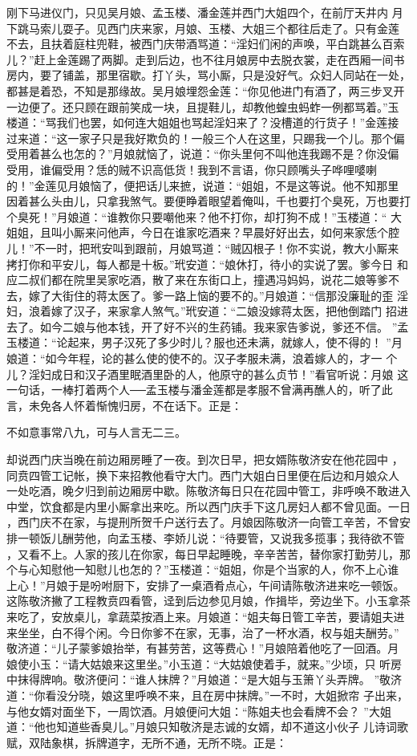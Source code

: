 刚下马进仪门，只见吴月娘、孟玉楼、潘金莲并西门大姐四个，在前厅天井内
月下跳马索儿耍子。见西门庆来家，月娘、玉楼、大姐三个都往后走了。只有金莲
不去，且扶着庭柱兜鞋，被西门庆带酒骂道：“淫妇们闲的声唤，平白跳甚么百索
儿？”赶上金莲踢了两脚。走到后边，也不往月娘房中去脱衣裳，走在西厢一间书
房内，要了铺盖，那里宿歇。打丫头，骂小厮，只是没好气。众妇人同站在一处，
都甚是着恐，不知是那缘故。吴月娘埋怨金莲：“你见他进门有酒了，两三步叉开
一边便了。还只顾在跟前笑成一块，且提鞋儿，却教他蝗虫蚂蚱一例都骂着。”玉
楼道：“骂我们也罢，如何连大姐姐也骂起淫妇来了？没槽道的行货子！”金莲接
过来道：“这一家子只是我好欺负的！一般三个人在这里，只踢我一个儿。那个偏
受用着甚么也怎的？”月娘就恼了，说道：“你头里何不叫他连我踢不是？你没偏
受用，谁偏受用？恁的贼不识高低货！我到不言语，你只顾嘴头子哗哩嘙喇
的！”金莲见月娘恼了，便把话儿来摭，说道：“姐姐，不是这等说。他不知那里
因着甚么头由儿，只拿我煞气。要便睁着眼望着俺叫，千也要打个臭死，万也要打
个臭死！”月娘道：“谁教你只要嘲他来？他不打你，却打狗不成！”玉楼道：“
大姐姐，且叫小厮来问他声，今日在谁家吃酒来？早晨好好出去，如何来家恁个腔
儿！”不一时，把玳安叫到跟前，月娘骂道：“贼囚根子！你不实说，教大小厮来
拷打你和平安儿，每人都是十板。”玳安道：“娘休打，待小的实说了罢。爹今日
和应二叔们都在院里吴家吃酒，散了来在东街口上，撞遇冯妈妈，说花二娘等爹不
去，嫁了大街住的蒋太医了。爹一路上恼的要不的。”月娘道：“信那没廉耻的歪
淫妇，浪着嫁了汉子，来家拿人煞气。”玳安道：“二娘没嫁蒋太医，把他倒踏门
招进去了。如今二娘与他本钱，开了好不兴的生药铺。我来家告爹说，爹还不信。
”孟玉楼道：“论起来，男子汉死了多少时儿？服也还未满，就嫁人，使不得的！
”月娘道：“如今年程，论的甚么使的使不的。汉子孝服未满，浪着嫁人的，才一
个儿？淫妇成日和汉子酒里眠酒里卧的人，他原守的甚么贞节！”看官听说：月娘
这一句话，一棒打着两个人──孟玉楼与潘金莲都是孝服不曾满再醮人的，听了此
言，未免各人怀着惭愧归房，不在话下。正是：

不如意事常八九，可与人言无二三。

却说西门庆当晚在前边厢房睡了一夜。到次日早，把女婿陈敬济安在他花园中
，同贲四管工记帐，换下来招教他看守大门。西门大姐白日里便在后边和月娘众人
一处吃酒，晚夕归到前边厢房中歇。陈敬济每日只在花园中管工，非呼唤不敢进入
中堂，饮食都是内里小厮拿出来吃。所以西门庆手下这几房妇人都不曾见面。一日
，西门庆不在家，与提刑所贺千户送行去了。月娘因陈敬济一向管工辛苦，不曾安
排一顿饭儿酬劳他，向孟玉楼、李娇儿说：“待要管，又说我多揽事；我待欲不管
，又看不上。人家的孩儿在你家，每日早起睡晚，辛辛苦苦，替你家打勤劳儿，那
个与心知慰他一知慰儿也怎的？”玉楼道：“姐姐，你是个当家的人，你不上心谁
上心！”月娘于是吩咐厨下，安排了一桌酒肴点心，午间请陈敬济进来吃一顿饭。
这陈敬济撇了工程教贲四看管，迳到后边参见月娘，作揖毕，旁边坐下。小玉拿茶
来吃了，安放桌儿，拿蔬菜按酒上来。月娘道：“姐夫每日管工辛苦，要请姐夫进
来坐坐，白不得个闲。今日你爹不在家，无事，治了一杯水酒，权与姐夫酬劳。”
敬济道：“儿子蒙爹娘抬举，有甚劳苦，这等费心！”月娘陪着他吃了一回酒。月
娘使小玉：“请大姑娘来这里坐。”小玉道：“大姑娘使着手，就来。”少顷，只
听房中抹得牌响。敬济便问：“谁人抹牌？”月娘道：“是大姐与玉箫丫头弄牌。
”敬济道：“你看没分晓，娘这里呼唤不来，且在房中抹牌。”一不时，大姐掀帘
子出来，与他女婿对面坐下，一周饮酒。月娘便问大姐：“陈姐夫也会看牌不会？
”大姐道：“他也知道些香臭儿。”月娘只知敬济是志诚的女婿，却不道这小伙子
儿诗词歌赋，双陆象棋，拆牌道字，无所不通，无所不晓。正是：

